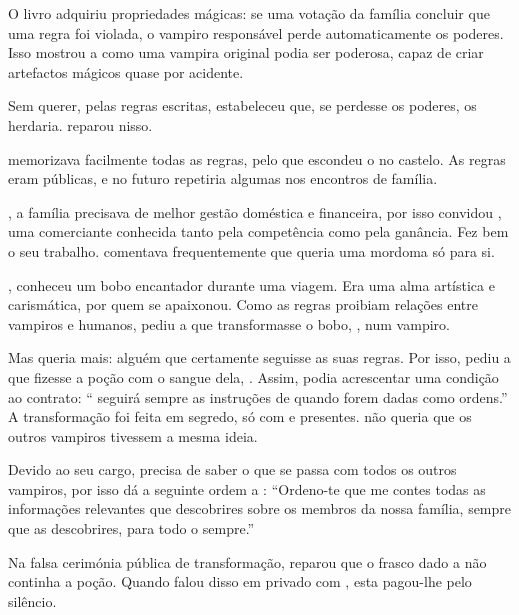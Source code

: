O livro adquiriu propriedades mágicas: se uma votação da família concluir que uma regra foi violada, o vampiro responsável perde automaticamente os poderes. Isso mostrou a  como uma vampira original podia ser poderosa, capaz de criar artefactos mágicos quase por acidente.

Sem querer, pelas regras escritas,  estabeleceu que, se perdesse os poderes,  os herdaria.  reparou nisso.

 memorizava facilmente todas as regras, pelo que escondeu o  no castelo. As regras eram públicas, e no futuro repetiria algumas nos encontros de família.

, a família precisava de melhor gestão doméstica e financeira, por isso convidou , uma comerciante conhecida tanto pela competência como pela ganância. Fez bem o seu trabalho.  comentava frequentemente que queria uma mordoma só para si.

,  conheceu um bobo encantador durante uma viagem. Era uma alma artística e carismática, por quem se apaixonou. Como as regras proibiam relações entre vampiros e humanos, pediu a  que transformasse o bobo, , num vampiro.

Mas  queria mais: alguém que certamente seguisse as suas regras. Por isso, pediu a  que fizesse a poção com o sangue dela, . Assim, podia acrescentar uma condição ao contrato: `` seguirá sempre as instruções de  quando forem dadas como ordens.'' A transformação foi feita em segredo, só com  e  presentes.  não queria que os outros vampiros tivessem a mesma ideia.

Devido ao seu cargo,  precisa de saber o que se passa com todos os outros vampiros, por isso dá a seguinte ordem a : ``Ordeno-te que me contes todas as informações relevantes que descobrires sobre os membros da nossa família, sempre que as descobrires, para todo o sempre.''

Na falsa cerimónia pública de transformação,  reparou que o frasco dado a  não continha a poção. Quando falou disso em privado com , esta pagou-lhe pelo silêncio.

